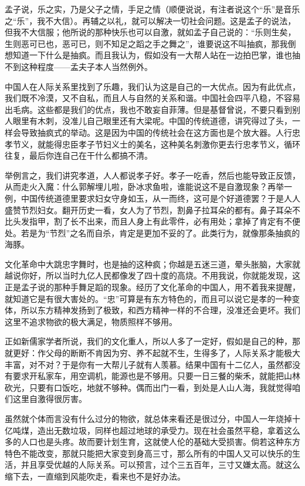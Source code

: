 孟子说，乐之实，乃是父子之情，手足之情（顺便说说，有注者说这个“乐”是音乐之“乐”，我不大信）。再辅之以礼，就可以解决一切社会问题。这是孟子的说法，但我不大信服；他所说的那种快乐也可以自激，就如孟子自己说的：“乐则生矣，生则恶可已也，恶可已，则不知足之蹈之手之舞之”，谁要说这不叫抽疯，那我倒想知道一下什么是抽疯。而且我认为，假如没有一大帮人站在一边拍巴掌，谁也抽不到这种程度——孟夫子本人当然例外。 

中国人在人际关系里找到了乐趣，我们认为这是自己的一大优点。因为有此优点，我们既不冷漠，又不自私，而且人与自然的关系和谐。中国社会四平八稳，不容易出毛病。这些都是我们的优点，我也不敢妄自菲薄。但是基督曾说，不要只看到别人眼里有木刺，没准儿自己眼里还有大梁呢。中国的传统道德，讲究得过了头，一样会导致抽疯式的举动。这是因为中国的传统社会在这方面也是个放大器。人行忠孝节义，就能得忠臣孝子节妇义士的美名，这种美名刺激你更去行忠孝节义，循环往复，最后你连自己在干什么都搞不清。 

举例言之，我们讲究孝道，人人都说孝子好。孝子一吃香，然后也能导致正反馈，从而走火入魔：什么郭解埋儿啦，卧冰求鱼啦，谁能说这不是自激现象？再举一例，中国传统道德里要求妇女守身如玉，从一而终，这可是个好道德罢？于是人人盛赞节烈妇女。翻开历史一看，女人为了节烈，割鼻子拉耳朵的都有。鼻子耳朵不比头发指甲，割了长不出来，而且人身上有此零件，必有用处；拿掉了肯定有不便处。若是为“节烈”之名而自杀，肯定是更加不妥的了。此类行为，就像那条抽疯的海豚。 

文化革命中大跳忠字舞时，也是抽的这种疯；你越是五迷三道，晕头胀脑，大家就越说你好，所以当时九亿人民都像发了四十度的高烧。不用我说，你就能发现，这正是孟子说的那种手舞足蹈的现象。经历了文化革命的中国人，用不着我来提醒，就知道它是有很大害处的。“忠”可算是有东方特色的，而且可以说它是孝的一种变体，所以东方精神发扬到了极致，和西方精神一样的不合理，没准还会更坏。我们这里不追求物欲的极大满足，物质照样不够用。 

正如新儒家学者所说，我们的文化重人，所以人多了一定好，假如是自己的种，那就更好：作父母的断断不肯因为穷、养不起就不生，生得多了，人际关系才能极大丰富，对不对？于是你有一大帮儿子就有人羡慕。结果中国有十二亿人，虽然都没有要求开私家车，用空调机，能源也是不够用。只要一日三餐的柴禾，就能把山林砍光，只要有口饭吃，地就不够种。偶而出门一看，到处是人山人海，我就觉得咱们这里自激得很厉害。 

虽然就个体而言没有什么过分的物欲，就总体来看还是很过分，中国人一年烧掉十亿吨煤，造出无数垃圾，同样也超过地球的承受力。现在社会虽然平稳，拿着这么多的人口也是头疼。故而要计划生育，这就使人伦的基础大受损害。倘若这种东方特色不能改变，那就只能把大家变到身高三寸，那么所有的中国人又可以快乐的生活，并且享受优越的人际关系。可以预言，过个三五百年，三寸又嫌太高。就这么缩下去，一直缩到风能吹走，看来也不是好办法。 

